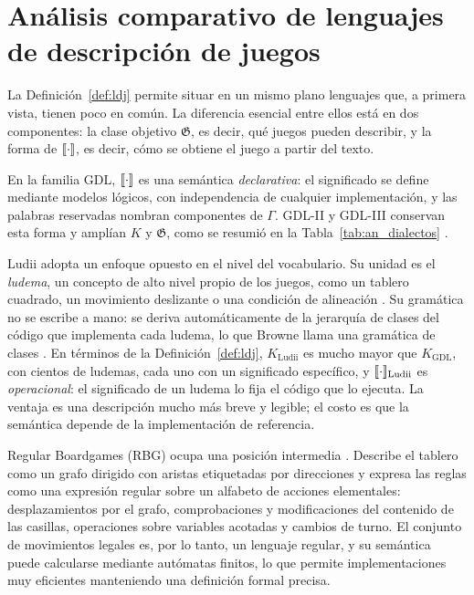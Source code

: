 \section{Análisis comparativo de lenguajes de descripción de juegos}
\label{sec:an_otros_lenguajes}

La Definición~\ref{def:ldj} permite situar en un mismo plano lenguajes que, a primera vista, tienen poco en común. La diferencia esencial entre ellos está en dos componentes: la clase objetivo $\mathfrak G$, es decir, qué juegos pueden describir, y la forma de $[\![\cdot]\!]$, es decir, cómo se obtiene el juego a partir del texto.

En la familia GDL, $[\![\cdot]\!]$ es una semántica \emph{declarativa}: el significado se define mediante modelos lógicos, con independencia de cualquier implementación, y las palabras reservadas nombran componentes de $\Gamma$. GDL-II y GDL-III conservan esta forma y amplían $K$ y $\mathfrak G$, como se resumió en la Tabla~\ref{tab:an_dialectos} \cite{Thielscher2010GDLII, Thielscher2017GDLIII}.

Ludii adopta un enfoque opuesto en el nivel del vocabulario. Su unidad es el \emph{ludema}, un concepto de alto nivel propio de los juegos, como un tablero cuadrado, un movimiento deslizante o una condición de alineación \cite{Browne2020Ludii}. Su gramática no se escribe a mano: se deriva automáticamente de la jerarquía de clases del código que implementa cada ludema, lo que Browne llama una gramática de clases \cite{Browne2016ClassGrammar}. En términos de la Definición~\ref{def:ldj}, $K_{\text{Ludii}}$ es mucho mayor que $K_{\mathrm{GDL}}$, con cientos de ludemas, cada uno con un significado específico, y $[\![\cdot]\!]_{\text{Ludii}}$ es \emph{operacional}: el significado de un ludema lo fija el código que lo ejecuta. La ventaja es una descripción mucho más breve y legible; el costo es que la semántica depende de la implementación de referencia.

Regular Boardgames (RBG) ocupa una posición intermedia \cite{Kowalski2019RBG}. Describe el tablero como un grafo dirigido con aristas etiquetadas por direcciones y expresa las reglas como una expresión regular sobre un alfabeto de acciones elementales: desplazamientos por el grafo, comprobaciones y modificaciones del contenido de las casillas, operaciones sobre variables acotadas y cambios de turno. El conjunto de movimientos legales es, por lo tanto, un lenguaje regular, y su semántica puede calcularse mediante autómatas finitos, lo que permite implementaciones muy eficientes manteniendo una definición formal precisa.

